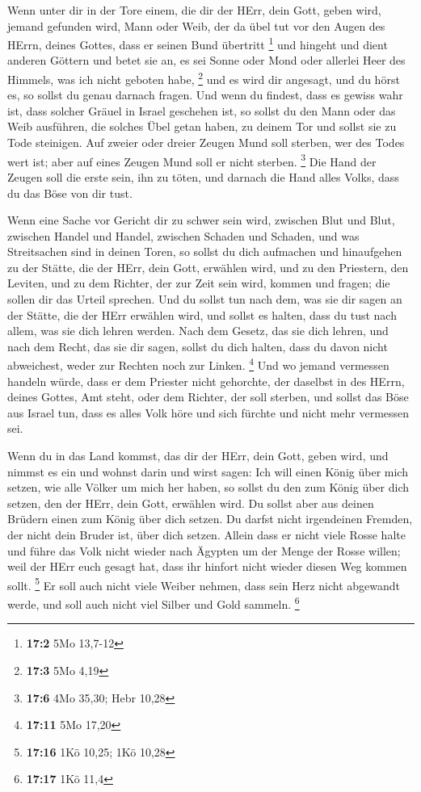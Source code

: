  Wenn unter dir in der Tore einem, die dir der HErr, dein
Gott, geben wird, jemand gefunden wird, Mann oder Weib, der da übel tut
vor den Augen des HErrn, deines Gottes, dass er seinen Bund übertritt
\footnote{\textbf{17:2} 5Mo 13,7-12}  und hingeht und dient
anderen Göttern und betet sie an, es sei Sonne oder Mond oder allerlei
Heer des Himmels, was ich nicht geboten habe, \footnote{\textbf{17:3}
  5Mo 4,19}  und es wird dir angesagt, und du hörst es, so
sollst du genau darnach fragen. Und wenn du findest, dass es gewiss wahr
ist, dass solcher Gräuel in Israel geschehen ist,  so sollst
du den Mann oder das Weib ausführen, die solches Übel getan haben, zu
deinem Tor und sollst sie zu Tode steinigen.  Auf zweier
oder dreier Zeugen Mund soll sterben, wer des Todes wert ist; aber auf
eines Zeugen Mund soll er nicht sterben. \footnote{\textbf{17:6} 4Mo
  35,30; Hebr 10,28}  Die Hand der Zeugen soll die erste
sein, ihn zu töten, und darnach die Hand alles Volks, dass du das Böse
von dir tust.

 Wenn eine Sache vor Gericht dir zu schwer sein wird,
zwischen Blut und Blut, zwischen Handel und Handel, zwischen Schaden und
Schaden, und was Streitsachen sind in deinen Toren, so sollst du dich
aufmachen und hinaufgehen zu der Stätte, die der HErr, dein Gott,
erwählen wird,  und zu den Priestern, den Leviten, und zu
dem Richter, der zur Zeit sein wird, kommen und fragen; die sollen dir
das Urteil sprechen.  Und du sollst tun nach dem, was sie
dir sagen an der Stätte, die der HErr erwählen wird, und sollst es
halten, dass du tust nach allem, was sie dich lehren werden.
 Nach dem Gesetz, das sie dich lehren, und nach dem Recht,
das sie dir sagen, sollst du dich halten, dass du davon nicht
abweichest, weder zur Rechten noch zur Linken. \footnote{\textbf{17:11}
  5Mo 17,20}  Und wo jemand vermessen handeln würde, dass
er dem Priester nicht gehorchte, der daselbst in des HErrn, deines
Gottes, Amt steht, oder dem Richter, der soll sterben, und sollst das
Böse aus Israel tun,  dass es alles Volk höre und sich
fürchte und nicht mehr vermessen sei.

 Wenn du in das Land kommst, das dir der HErr, dein Gott,
geben wird, und nimmst es ein und wohnst darin und wirst sagen: Ich will
einen König über mich setzen, wie alle Völker um mich her haben,
 so sollst du den zum König über dich setzen, den der HErr,
dein Gott, erwählen wird. Du sollst aber aus deinen Brüdern einen zum
König über dich setzen. Du darfst nicht irgendeinen Fremden, der nicht
dein Bruder ist, über dich setzen.  Allein dass er nicht
viele Rosse halte und führe das Volk nicht wieder nach Ägypten um der
Menge der Rosse willen; weil der HErr euch gesagt hat, dass ihr hinfort
nicht wieder diesen Weg kommen sollt. \footnote{\textbf{17:16} 1Kö
  10,25; 1Kö 10,28}  Er soll auch nicht viele Weiber
nehmen, dass sein Herz nicht abgewandt werde, und soll auch nicht viel
Silber und Gold sammeln. \footnote{\textbf{17:17} 1Kö 11,4}

